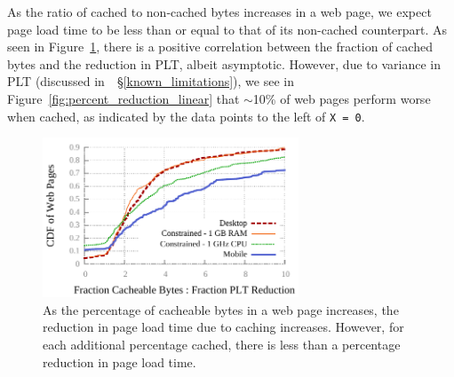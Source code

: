 As the ratio of cached to non-cached bytes increases in a web page, we expect page load time to be less than or equal to that of its non-cached counterpart. As seen in Figure~\ref{fig:ratio_linear_comparison}, there is a positive correlation between the fraction of cached bytes and the reduction in PLT, albeit asymptotic.
However, due to variance in PLT (discussed in~~\S\ref{known_limitations}), we
see in Figure~\ref{fig:percent_reduction_linear} that
{\footnotesize$\sim$}10\% of web pages perform worse when cached, as
indicated by the data points to the left of \texttt{X = 0}.
\begin{figure}[t]
    \includegraphics[width=3in]{../graphs/ratio_bytes_to_reduction/ratio_linear_comparison.pdf}
    \caption[]{\label{fig:ratio_linear_comparison}As the percentage of cacheable bytes in a web page increases, the reduction in page load time due to caching increases. However, for each additional percentage cached, there is less than a percentage reduction in page load time.}
\end{figure}
